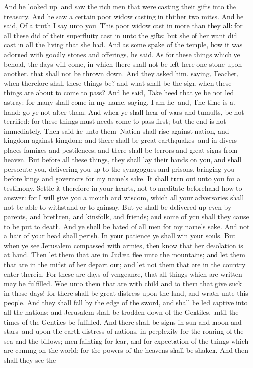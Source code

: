 And he looked up, and saw the rich men that were casting their gifts into the treasury. And he saw a certain poor widow casting in thither two mites. And he said, Of a truth I say unto you, This poor widow cast in more than they all: for all these did of their superfluity cast in unto the gifts; but she of her want did cast in all the living that she had.  And as some spake of the temple, how it was adorned with goodly stones and offerings, he said, As for these things which ye behold, the days will come, in which there shall not be left here one stone upon another, that shall not be thrown down. And they asked him, saying, Teacher, when therefore shall these things be? and what shall be the sign when these things are about to come to pass? And he said, Take heed that ye be not led astray: for many shall come in my name, saying, I am he; and, The time is at hand: go ye not after them. And when ye shall hear of wars and tumults, be not terrified: for these things must needs come to pass first; but the end is not immediately.  Then said he unto them, Nation shall rise against nation, and kingdom against kingdom; and there shall be great earthquakes, and in divers places famines and pestilences; and there shall be terrors and great signs from heaven. But before all these things, they shall lay their hands on you, and shall persecute you, delivering you up to the synagogues and prisons, bringing you before kings and governors for my name’s sake. It shall turn out unto you for a testimony. Settle it therefore in your hearts, not to meditate beforehand how to answer: for I will give you a mouth and wisdom, which all your adversaries shall not be able to withstand or to gainsay. But ye shall be delivered up even by parents, and brethren, and kinsfolk, and friends; and some of you shall they cause to be put to death. And ye shall be hated of all men for my name’s sake. And not a hair of your head shall perish. In your patience ye shall win your souls.  But when ye see Jerusalem compassed with armies, then know that her desolation is at hand. Then let them that are in Judæa flee unto the mountains; and let them that are in the midst of her depart out; and let not them that are in the country enter therein. For these are days of vengeance, that all things which are written may be fulfilled. Woe unto them that are with child and to them that give suck in those days! for there shall be great distress upon the land, and wrath unto this people. And they shall fall by the edge of the sword, and shall be led captive into all the nations: and Jerusalem shall be trodden down of the Gentiles, until the times of the Gentiles be fulfilled.  And there shall be signs in sun and moon and stars; and upon the earth distress of nations, in perplexity for the roaring of the sea and the billows; men fainting for fear, and for expectation of the things which are coming on the world: for the powers of the heavens shall be shaken. And then shall they see the 